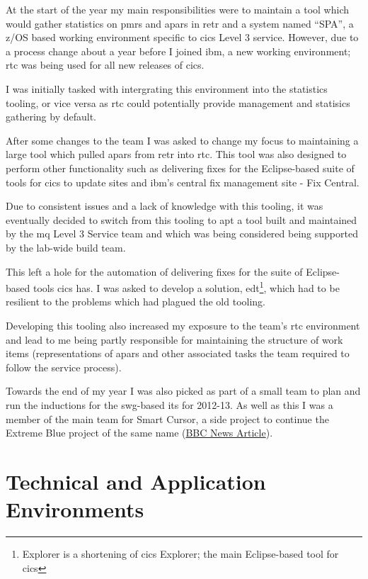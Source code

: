 \documentclass[a4paper,11pt]{report}
\begin{document}
At the start of the year my main responsibilities were to maintain a tool which would gather 
statistics on \gls{pmr}s and \gls{apar}s in \gls{retr} and a system named ``SPA'', a z/OS based
working environment specific to \gls{cics} Level 3 service. However, due to a process change about
a year before I joined \gls{ibm}, a new working environment; \gls{rtc} was being used for all new
releases of \gls{cics}.

I was initially tasked with intergrating this environment into the 
statistics tooling, or vice versa as \gls{rtc} could potentially provide management and statisics
gathering by default.

After some changes to the team I was asked to change my focus to maintaining a large tool which
pulled \gls{apar}s from \gls{retr} into \gls{rtc}. This tool was also designed to perform other
functionality such as delivering fixes for the Eclipse-based suite of tools for \gls{cics} to
update sites and \gls{ibm}'s central fix management site - Fix Central.

Due to consistent issues and a lack of knowledge with this tooling, it was eventually decided to
switch from this tooling to \gls{apt} a tool built and maintained by the \gls{mq} Level 3 Service 
team and which was being considered being supported by the lab-wide build team.

This left a hole for the automation of delivering fixes for the suite of Eclipse-based tools 
\gls{cics} has. I was asked to develop a solution, \gls{edt}\footnote{Explorer is a shortening of 
\gls{cics} Explorer; the main Eclipse-based tool for \gls{cics}}, which had to be resilient to the
problems which had plagued the old tooling.

Developing this tooling also increased my exposure to the team's \gls{rtc} environment and lead to
me being partly responsible for maintaining the structure of work items (representations of 
\gls{apar}s and other associated tasks the team required to follow the service process).

Towards the end of my year I was also picked as part of a small team to plan and run the inductions
for the \gls{swg}-based \gls{it}s for 2012-13. As well as this I was a member of the main team for
Smart Cursor, a side project to continue the Extreme Blue project of the same name
(\href{http://www.bbc.co.uk/news/technology-14859157}{BBC News Article}).

\chapter{Technical and Application Environments}
\end{document}
